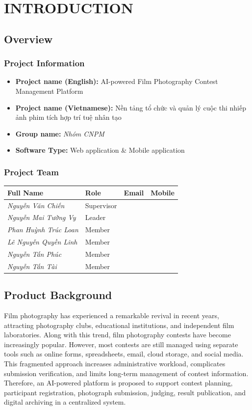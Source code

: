 \chapter{INTRODUCTION} 

\section{Overview}
\subsection{Project Information }
\begin{itemize}
  \item \textbf{Project name (English):} AI-powered Film Photography Contest Management Platform
    \item \textbf{Project name (Vietnamese):} Nền tảng tổ chức và quản lý cuộc thi nhiếp ảnh phim tích hợp trí tuệ nhân tạo
    \item \textbf{Group name:} \textit{Nhóm CNPM}
    \item \textbf{Software Type:} Web application \& Mobile application
\end{itemize}
\subsection{Project Team}
\begin{table}[h!]
\centering
\begin{tabular}{|l|l|l|l|}
\hline
\textbf{Full Name} & \textbf{Role} & \textbf{Email} & \textbf{Mobile} \\ \hline
\textit{Nguyễn Văn Chiến} & Supervisor & & \\ \hline
\textit{Nguyễn Mai Tường Vy} & Leader & & \\ \hline
\textit{Phan Huỳnh Trúc Loan} & Member & & \\ \hline
\textit{Lê Nguyễn Quyền Linh} & Member & & \\ \hline
\textit{Nguyễn Tấn Phúc} & Member & & \\ \hline
\textit{Nguyễn Tấn Tài} & Member & & \\ \hline
\end{tabular}
\end{table}

\section{Product Background}
Film photography has experienced a remarkable revival in recent years, attracting photography clubs, educational institutions, and independent film laboratories. Along with this trend, film photography contests have become increasingly popular. However, most contests are still managed using separate tools such as online forms, spreadsheets, email, cloud storage, and social media. This fragmented approach increases administrative workload, complicates submission verification, and limits long-term management of contest information. Therefore, an AI-powered platform is proposed to support contest planning, participant registration, photograph submission, judging, result publication, and digital archiving in a centralized system.

